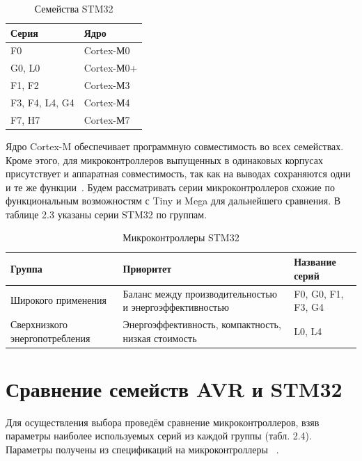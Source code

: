 \begin{table}[H]
\caption{Семейства STM32}
\begin{tabular}{|p{4 cm}|p{4 cm}|}
\hline
Серия & Ядро \\ \hline
F0  & Cortex-М0 \\ \hline
G0, L0  & Cortex-М0+ \\ \hline
F1, F2  & Cortex-М3 \\ \hline
F3, F4, L4, G4  & Cortex-М4 \\ \hline
F7, H7  & Cortex-М7 \\ \hline
\end{tabular}
\end{table}

	Ядро Cortex-M обеспечивает программную совместимость во всех семействах. Кроме этого, для микроконтроллеров выпущенных в одинаковых корпусах присутствует и аппаратная совместимость, так как на выводах сохраняются одни и те же функции~\cite{stm}. Будем рассматривать серии микроконтроллеров схожие по функциональным возможностям с Tiny и Mega для дальнейшего сравнения. В таблице 2.3 указаны серии STM32 по группам.
	
\begin{table}[H]
\caption{Микроконтроллеры STM32}
\begin{tabular}{|p{3.25 cm}|p{8 cm}|p{4 cm}|}
\hline
Группа & Приоритет & Название серий \\ \hline
Широкого применения & Баланс между производительностью и энергоэффективностью & F0, G0, F1, F3,
G4 \\ \hline
Сверхнизкого энергопотребления & Энергоэффективность, компактность, низкая стоимость & L0, L4 \\ \hline
\end{tabular}
\end{table}

\section{Сравнение семейств AVR и STM32}
	
	Для осуществления выбора проведём сравнение микроконтроллеров, взяв параметры наиболее используемых серий из каждой группы (табл. 2.4). Параметры получены из спецификаций на микроконтроллеры ~\cite{f103,l1010f4,atmega32,attiny10}.
	
